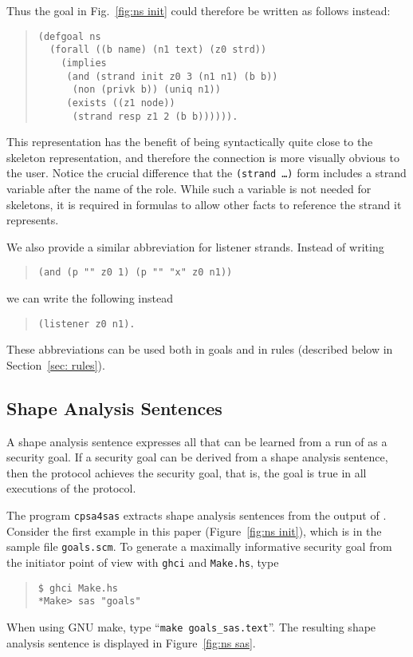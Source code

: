 Thus the goal in Fig.~\ref{fig:ns init} could therefore be written as
follows instead:

\begin{quote}
\begin{verbatim}
(defgoal ns
  (forall ((b name) (n1 text) (z0 strd))
    (implies
     (and (strand init z0 3 (n1 n1) (b b))
      (non (privk b)) (uniq n1))
     (exists ((z1 node))
      (strand resp z1 2 (b b)))))).
\end{verbatim}
\end{quote}

This representation has the benefit of being syntactically quite close
to the skeleton representation, and therefore the connection is more
visually obvious to the user. Notice the crucial difference that the
\texttt{(strand  \ldots)} form includes a strand variable
after the name of the role. While such a variable is not needed for
skeletons, it is required in formulas to allow other facts to
reference the strand it represents.

We also provide a similar abbreviation for listener strands. Instead
of writing

\begin{quote}
\begin{verbatim}
(and (p "" z0 1) (p "" "x" z0 n1))
\end{verbatim}
\end{quote}
we can write the following instead
\begin{quote}
\begin{verbatim}
(listener z0 n1).
\end{verbatim}
\end{quote}

These abbreviations can be used both in goals and in rules (described
below in Section~\ref{sec: rules}).

\subsection{Shape Analysis Sentences}\label{sec:sas}

A shape analysis sentence expresses all that can be learned from a run
of {\cpsa} as a security goal.  If a security goal can be derived from
a shape analysis sentence, then the protocol achieves the security
goal, that is, the goal is true in all executions of the protocol.

The program \texttt{cpsa4sas} extracts shape analysis sentences from
the output of {\cpsa}.  Consider the first example in this paper
(Figure~\ref{fig:ns init}), which is in the sample file
\texttt{goals.scm}.  To generate a maximally informative security goal
from the initiator point of view with \texttt{ghci} and
\texttt{Make.hs}, type
\begin{quote}
\begin{verbatim}
$ ghci Make.hs
*Make> sas "goals"
\end{verbatim}
\end{quote}
When using GNU make, type ``\texttt{make goals\_sas.text}''.  The
resulting shape analysis sentence is displayed in Figure~\ref{fig:ns
  sas}.

